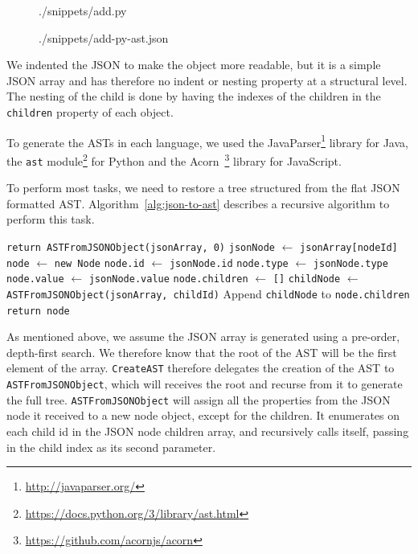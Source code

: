 \begin{figure}
  
    {./snippets/add.py}
\end{figure}

\begin{figure}
  
    {./snippets/add-py-ast.json}
\end{figure}

We indented the JSON to make the object more readable, but it is a simple JSON
array and has therefore no indent or nesting property at a structural level. The
nesting of the child is done by having the indexes of the children in the
\lstinline{children} property of each object.

To generate the ASTs in each language, we used the
JavaParser\footnote{\url{http://javaparser.org/}} library for Java, the
\lstinline{ast} module\footnote{\url{https://docs.python.org/3/library/ast.html}} for
Python and the Acorn~\footnote{\url{https://github.com/acornjs/acorn}} library for
JavaScript.

To perform most tasks, we need to restore a tree structured from the flat JSON
formatted AST. Algorithm~\ref{alg:json-to-ast} describes a recursive algorithm
to perform this task.

\begin{algorithm}
  \caption{\label{alg:json-to-ast}Tree-structured AST from JSON formatted AST}
  \begin{algorithmic}[1]
      \State \lstinline{return ASTFromJSONObject(jsonArray, 0)}
    \EndFunction%
      \State \lstinline{jsonNode} $\gets$ \lstinline{jsonArray[nodeId]}
      \State \lstinline{node} $\gets$ \lstinline{new Node}
      \State \lstinline{node.id} $\gets$ \lstinline{jsonNode.id}
      \State \lstinline{node.type} $\gets$ \lstinline{jsonNode.type}
      \State \lstinline{node.value} $\gets$ \lstinline{jsonNode.value}
      \State \lstinline{node.children} $\gets$ \lstinline{[]}
        \State \lstinline{childNode} $\gets$
        \lstinline{ASTFromJSONObject(jsonArray, childId)}
        \State Append \lstinline{childNode} to \lstinline{node.children}
      \EndFor
      \State \lstinline{return node}
    \EndFunction%
  \end{algorithmic}
\end{algorithm}
As mentioned above, we assume the JSON array is generated using a pre-order,
depth-first search. We therefore know that the root of the AST will be the first
element of the array. \lstinline{CreateAST} therefore delegates the creation of
the AST to \lstinline{ASTFromJSONObject}, which will receives the root and
recurse from it to generate the full tree. \lstinline{ASTFromJSONObject} will
assign all the properties from the JSON node it received to a new node object,
except for the children. It enumerates on each child id in the JSON node
children array, and recursively calls itself, passing in the child index as its
second parameter.

